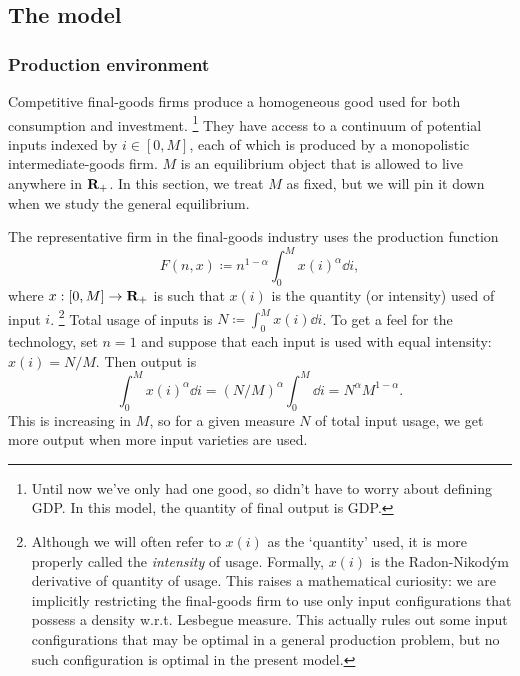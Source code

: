 \documentclass[11pt,letterpaper,reqno,oneside]{article}
\begin{document}
\subsection{The \texorpdfstring{\textcite{Romer1987}}{Romer (1987)} model}
\label{sec:02Nov2015:Romer1987_model}


\subsubsection{Production environment}
\label{sec:02Nov2015:Romer1987_model:production_environment}

Competitive final-goods firms produce a homogeneous good used for both consumption and investment.%
	\footnote{Until now we've only had one good, so didn't have to worry about defining GDP. In this model, the quantity of final output is GDP.}
They have access to a continuum of potential inputs indexed by $i \in [0,M]$, each of which is produced by a monopolistic intermediate-goods firm. $M$ is an equilibrium object that is allowed to live anywhere in $\mathbf{R}_+$. In this section, we treat $M$ as fixed, but we will pin it down when we study the general equilibrium.

The representative firm in the final-goods industry uses the production function
%
\begin{equation*}
	F(n,x) \coloneqq n^{1-\alpha} \int_0^M x(i)^\alpha \dd i ,
\end{equation*}
%
where $x : [0,M] \to \mathbf{R}_+$ is such that $x(i)$ is the quantity (or intensity) used of input $i$.%
	\footnote{Although we will often refer to $x(i)$ as the `quantity' used, it is more properly called the \emph{intensity} of usage. Formally, $x(i)$ is the Radon-Nikod\'{y}m derivative of quantity of usage. This raises a mathematical curiosity: we are implicitly restricting the final-goods firm to use only input configurations that possess a density w.r.t. Lesbegue measure. This actually rules out some input configurations that may be optimal in a general production problem, but no such configuration is optimal in the present model.}
Total usage of inputs is $N \coloneqq \int_0^M x(i) \dd i$. To get a feel for the technology, set $n=1$ and suppose that each input is used with equal intensity: $x(i) = N/M$. Then output is
%
\begin{equation*}
	\int_0^M x(i)^\alpha \dd i 
	= (N/M)^\alpha \int_0^M \dd i 
	= N^\alpha M^{1-\alpha} .
\end{equation*}
%
This is increasing in $M$, so for a given measure $N$ of total input usage, we get more output when more input varieties are used.
\end{document}
